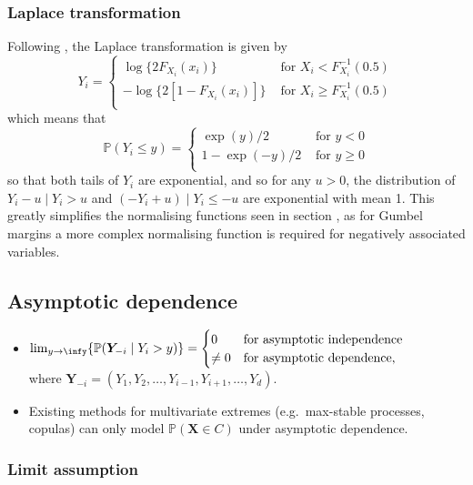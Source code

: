\documentclass{article}
\begin{document}
\subsubsection{Laplace transformation}
Following , the Laplace transformation is given by
\[
  Y_i = \begin{cases}
    \log\{2F_{X_i}(x_i)\} &\text{ for } X_i < F_{X_i}^{-1}(0.5) \\
    -\log\{2[1 - F_{X_i}(x_i)]\} &\text{ for } X_i \ge F_{X_i}^{-1}(0.5) \\
  \end{cases}
\]
which means that 
\[
  \mathbb{P}(Y_i \le y) = \begin{cases}
    \exp(y)/2 &\text{ for } y < 0 \\
    1-\exp(-y)/2 &\text{ for } y \ge 0 \\
  \end{cases}
\]
so that both tails of $Y_i$ are exponential, and so for any $u > 0$, the distribution of $Y_i - u \mid Y_i > u$ and $(-Y_i + u) \mid Y_i \le -u$ are exponential with mean 1. 
This greatly simplifies the normalising functions seen in section , as for Gumbel margins a more complex normalising function is required for negatively associated variables. 

\subsection{Asymptotic dependence}

\begin{itemize}
  \item $
      \lim_{y \rightarrow \infy}\{\mathbb{P}(\bm{Y}_{-i} \mid Y_i > y)\} = \begin{cases}
      0 &\text{for asymptotic independence} \\
      \ne 0 &\text{for asymptotic dependence}, 
    \end{cases}
    $ \\
  where $\bm{Y}_{-i} = (Y_1, Y_2, \ldots, Y_{i-1}, Y_{i+1}, \ldots, Y_d)$. 
  \item Existing methods for multivariate extremes (e.g.\ max-stable processes, copulas) can only model $\mathbb{P}(\bm{X} \in C)$ under asymptotic dependence.
\end{itemize}

\subsubsection{Limit assumption}
\end{document}
